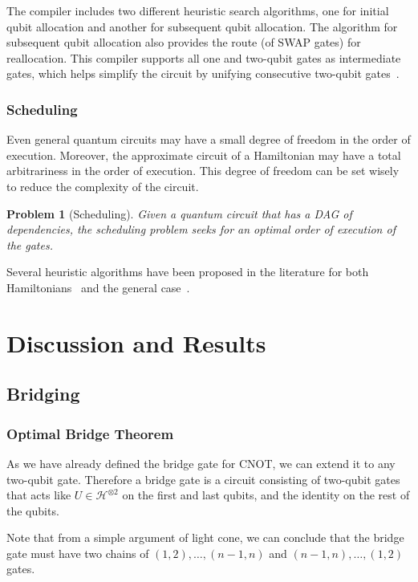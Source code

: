 \documentclass{report}
\newtheorem{problem}{Problem}
\begin{document}
The compiler includes two different heuristic search algorithms, one for initial qubit allocation and another for subsequent qubit allocation. The algorithm for subsequent qubit allocation also provides the route (of SWAP gates) for reallocation. This compiler supports all one and two-qubit gates as intermediate gates, which helps simplify the circuit by unifying consecutive two-qubit gates~\cite{lao2021}.


\subsection{Scheduling}

Even general quantum circuits may have a small degree of freedom in the order of execution. Moreover, the approximate circuit of a Hamiltonian may have a total arbitrariness in the order of execution. This degree of freedom can be set wisely to reduce the complexity of the circuit.

\begin{problem}[Scheduling]
  Given a quantum circuit that has a DAG of dependencies, the scheduling problem seeks for an optimal order of execution of the gates.
\end{problem}

Several heuristic algorithms have been proposed in the literature for both Hamiltonians~\cite{lao2021} and the general case~\cite{zhou2020, zulehner2018}.

\chapter{Discussion and Results}\label{chap:discussion}

\section{Bridging}
\subsection{Optimal Bridge Theorem}

As we have already defined the bridge gate for CNOT, we can extend it to any two-qubit gate. Therefore a bridge gate is a circuit consisting of two-qubit gates that acts like $U \in \mathcal{H}^{\otimes 2}$ on the first and last qubits, and the identity on the rest of the qubits.

Note that from a simple argument of light cone, we can conclude that the bridge gate must have two chains of $(1, 2), \dots ,(n-1, n)$ and $(n-1, n), \dots, (1, 2)$ gates.
\end{document}
